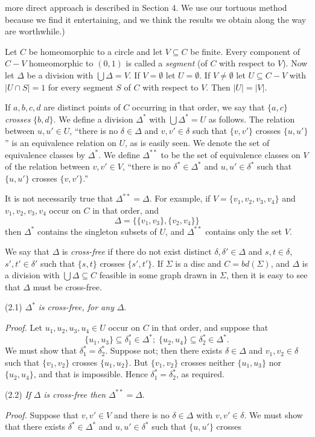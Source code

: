 \noindent more direct approach is described in Section 4. We use our tortuous method because we find it entertaining, and we think the results we obtain along the way are worthwhile.)

Let $C$ be homeomorphic to a circle and let $V \subseteq C$ be finite. Every component of $C - V$ homeomorphic to $(0, 1)$ is called a \textit{segment} (of $C$ with respect to $V$). Now let $\Delta$ be a division with $\bigcup \Delta = V$. If $V = \emptyset$ let $U = \emptyset$. If $V \ne \emptyset$ let $U \subseteq C - V$ with $|U \cap S| = 1$ for every segment $S$ of $C$ with respect to $V$. Then $|U| = |V|$.

If $a, b, c, d$ are distinct points of $C$ occurring in that order, we say that $\{a, c\}$ \textit{crosses} $\{b, d\}$. We define a division $\Delta^*$ with $\bigcup \Delta^* = U$ as follows. The relation between $u, u' \in U$, ``there is no $\delta \in \Delta$ and $v, v' \in \delta$ such that $\{v, v'\}$ crosses $\{u, u'\}$'' is an equivalence relation on $U$, as is easily seen. We denote the set of equivalence classes by $\Delta^*$. We define $\Delta^{**}$ to be the set of equivalence classes on $V$ of the relation between $v, v' \in V$, ``there is no $\delta^* \in \Delta^*$ and $u, u' \in \delta^*$ such that $\{u, u'\}$ crosses $\{v, v'\}$.''

It is not necessarily true that $\Delta^{**} = \Delta$. For example, if $V = \{v_1, v_2, v_3, v_4\}$ and $v_1, v_2, v_3, v_4$ occur on $C$ in that order, and
\begin{equation*}
\Delta = \{\{v_1, v_3\}, \{v_2, v_4\}\}
\end{equation*}
then $\Delta^*$ contains the singleton subsets of $U$, and $\Delta^{**}$ contains only the set $V$.

We say that $\Delta$ is \textit{cross-free} if there do not exist distinct $\delta, \delta' \in \Delta$ and $s, t \in \delta$, $s', t' \in \delta'$ such that $\{s, t\}$ crosses $\{s', t'\}$. If $\Sigma$ is a disc and $C = bd(\Sigma)$, and $\Delta$ is a division with $\bigcup \Delta \subseteq C$ feasible in some graph drawn in $\Sigma$, then it is easy to see that $\Delta$ must be cross-free.

\stmt
(2.1) $\Delta^*$ \textit{is cross-free, for any} $\Delta$.

\textit{Proof.} Let $u_1, u_2, u_3, u_4 \in U$ occur on $C$ in that order, and suppose that
\begin{equation*}
\{u_1, u_3\} \subseteq \delta_1^* \in \Delta^*;\; \{u_2, u_4\} \subseteq \delta_2^* \in \Delta^*.
\end{equation*}
We must show that $\delta_1^* = \delta_2^*$. Suppose not; then there exists $\delta \in \Delta$ and $v_1, v_2 \in \delta$ such that $\{v_1, v_2\}$ crosses $\{u_1, u_2\}$. But $\{v_1, v_2\}$ crosses neither $\{u_1, u_3\}$ nor $\{u_2, u_4\}$, and that is impossible. Hence $\delta_1^* = \delta_2^*$, as required.

\stmt
(2.2) \textit{If} $\Delta$ \textit{is cross-free then} $\Delta^{**} = \Delta$.

\textit{Proof.} Suppose that $v, v' \in V$ and there is no $\delta \in \Delta$ with $v, v' \in \delta$. We must show that there exists $\delta^* \in \Delta^*$ and $u, u' \in \delta^*$ such that $\{u, u'\}$ crosses
